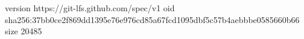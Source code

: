 version https://git-lfs.github.com/spec/v1
oid sha256:37bb0ce2f869dd1395e76e976cd85a67fcd1095dbf5c57b4aebbbe0585660b66
size 20485
